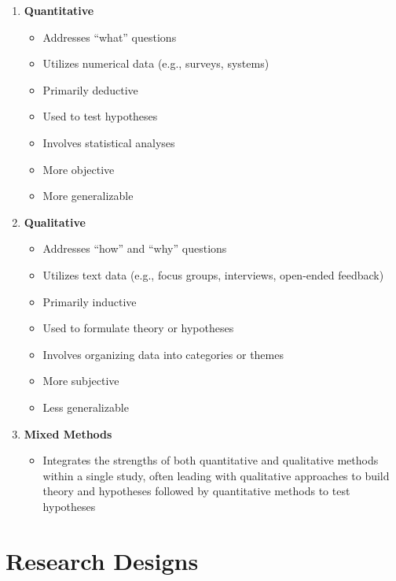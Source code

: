 \documentclass[
]{book}
\providecommand{\tightlist}{%
  \setlength{\itemsep}{0pt}\setlength{\parskip}{0pt}}
\begin{document}
\begin{enumerate}
\def\labelenumi{\arabic{enumi}.}
\tightlist
\item
  \textbf{Quantitative}

  \begin{itemize}
  \tightlist
  \item
    Addresses ``what'' questions
  \item
    Utilizes numerical data (e.g., surveys, systems)
  \item
    Primarily deductive
  \item
    Used to test hypotheses
  \item
    Involves statistical analyses
  \item
    More objective
  \item
    More generalizable
  \end{itemize}
\item
  \textbf{Qualitative}

  \begin{itemize}
  \tightlist
  \item
    Addresses ``how'' and ``why'' questions
  \item
    Utilizes text data (e.g., focus groups, interviews, open-ended feedback)
  \item
    Primarily inductive
  \item
    Used to formulate theory or hypotheses
  \item
    Involves organizing data into categories or themes
  \item
    More subjective
  \item
    Less generalizable
  \end{itemize}
\item
  \textbf{Mixed Methods}

  \begin{itemize}
  \tightlist
  \item
    Integrates the strengths of both quantitative and qualitative methods within a single study, often leading with qualitative approaches to build theory and hypotheses followed by quantitative methods to test hypotheses
  \end{itemize}
\end{enumerate}

\hypertarget{research-designs}{%
\section{Research Designs}\label{research-designs}}
\end{document}
